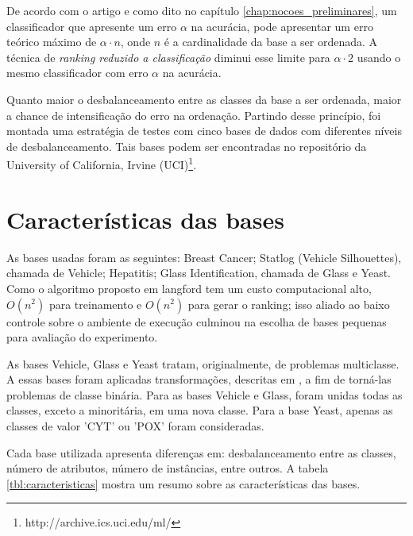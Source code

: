 De acordo com o artigo \cite{langford08} e como dito no capítulo \ref{chap:nocoes_preliminares}, um classificador que apresente um erro $\alpha$ na acurácia, pode apresentar um erro teórico máximo de $\alpha \cdot n$, onde $n$ é a cardinalidade da base a ser ordenada. A técnica de \emph{ranking reduzido a classificação} diminui esse limite para $\alpha \cdot 2$ usando o mesmo classificador com erro $\alpha$ na acurácia.

Quanto maior o desbalanceamento entre as classes da base a ser ordenada, maior a chance de intensificação do erro na ordenação. Partindo desse princípio, foi montada uma estratégia de testes com cinco bases de dados com diferentes níveis de desbalanceamento. Tais bases podem ser encontradas no repositório da University of California, Irvine (UCI)\footnote{http://archive.ics.uci.edu/ml/}.

\section{Características das bases}

As bases usadas foram as seguintes: Breast Cancer; Statlog (Vehicle Silhouettes), chamada de Vehicle; Hepatitis; Glass Identification, chamada de Glass e Yeast. Como o algoritmo proposto em {{langford}} tem um custo computacional alto, $O(n^2)$ para treinamento e $O(n^2)$ para gerar o ranking; isso aliado ao baixo controle sobre o ambiente de execução culminou na escolha de bases pequenas para avaliação do experimento.

As bases Vehicle, Glass e Yeast tratam, originalmente, de problemas multiclasse. A essas bases foram aplicadas transformações, descritas em \cite{guo04}, a fim de torná-las problemas de classe binária. Para as bases Vehicle e Glass, foram unidas todas as classes, exceto a minoritária, em uma nova classe. Para a base Yeast, apenas as classes de valor 'CYT' ou 'POX' foram consideradas.

Cada base utilizada apresenta diferenças em: desbalanceamento entre as classes, número de atributos, número de instâncias, entre outros. A tabela \ref{tbl:caracteristicas} mostra um resumo sobre as características das bases.

